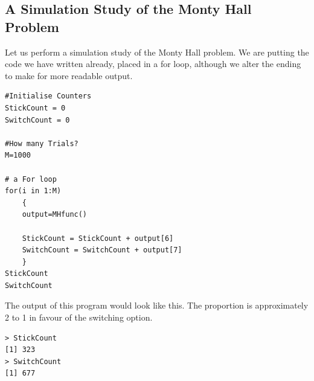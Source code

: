 \documentclass[11pt]{article} %
\begin{document}
\newpage
\subsection{ A Simulation Study of the Monty Hall Problem}
Let us perform a simulation study of the Monty Hall problem. We are putting the code we have
written already, placed in a for loop, although we alter the ending to make for more readable
output.
\begin{framed}
\begin{verbatim}
#Initialise Counters
StickCount = 0   
SwitchCount = 0

#How many Trials?
M=1000

# a For loop
for(i in 1:M)
	{
	output=MHfunc()

	StickCount = StickCount + output[6]
	SwitchCount = SwitchCount + output[7]
	}
StickCount
SwitchCount
\end{verbatim}
\end{framed}

The output of this program would look like this. The proportion is approximately 2 to 1 in
favour of the switching option.
\begin{verbatim}
> StickCount
[1] 323
> SwitchCount
[1] 677
\end{verbatim}
\newpage
\end{document}
